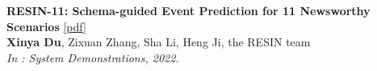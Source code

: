 \begin{enumerate}[{[}1{]},leftmargin=*]
\item
{\bf RESIN-11: Schema-guided Event Prediction for 11 Newsworthy Scenarios} 
\href{https://aclanthology.org/2022.naacl-demo.7.pdf}{{[pdf]}} \\
{\bf Xinya Du}, Zixuan Zhang, Sha Li, Heng Ji, the RESIN team \\
{\it In \NAACL: System Demonstrations, 2022.} \\












\end{enumerate}
